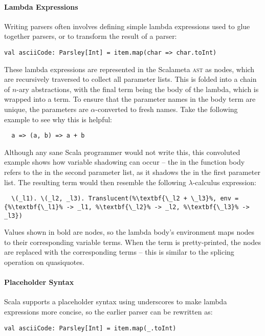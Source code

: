 \documentclass[../../main.tex]{subfiles}
\begin{document}
\paragraph{Lambda Expressions}
Writing parsers often involves defining simple lambda expressions used to glue together parsers, or to transform the result of a parser:
\begin{verbatim}
val asciiCode: Parsley[Int] = item.map(char => char.toInt)
\end{verbatim}

These lambda expressions are represented in the Scalameta \textsc{ast} as  nodes, which are recursively traversed to collect all parameter lists.
This is folded into a chain of $n$-ary abstractions, with the final term being the body of the lambda, which is wrapped into a  term.
To ensure that the parameter names in the  body term are unique, the parameters are $\alpha$-converted to fresh names.
Take the following example to see why this is helpful:
\begin{verbatim}
  a => (a, b) => a + b
\end{verbatim}
Although any sane Scala programmer would not write this, this convoluted example shows how variable shadowing can occur -- the  in the function body refers to the  in the second parameter list, as it shadows the  in the first parameter list.
The resulting  term would then resemble the following $\lambda$-calculus expression:
\begin{lstlisting}
  \(_l1). \(_l2, _l3). Translucent(%\textbf{\_l2 + \_l3}%, env = {%\textbf{\_l1}% -> _l1, %\textbf{\_l2}% -> _l2, %\textbf{\_l3}% -> _l3})
\end{lstlisting}
Values shown in bold are  nodes, so the lambda body's environment maps  nodes to their corresponding variable terms.
When the term is pretty-printed, the  nodes are replaced with the corresponding  terms -- this is similar to the splicing operation on quasiquotes.

\paragraph{Placeholder Syntax}
Scala supports a placeholder syntax using underscores to make lambda expressions more concise, so the earlier parser can be rewritten as:
\begin{verbatim}
val asciiCode: Parsley[Int] = item.map(_.toInt)
\end{verbatim}
\end{document}
